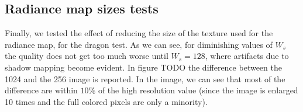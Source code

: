 \FloatBarrier

\subsection{Radiance map sizes tests}
Finally, we tested the effect of reducing the size of the texture used for the radiance map, for the dragon test. As we can see, for diminishing values of $W_s$ the quality does not get too much worse until $W_s = 128$, where artifacts due to shadow mapping become evident. In figure TODO the difference between the 1024 and the 256 image is reported. In the image, we can see that most of the difference are within $10\%$ of the high resolution value (since the image is enlarged 10 times and the full colored pixels are only a minority).

\begin{figure}
\centering
{}
\\
\end{figure}
